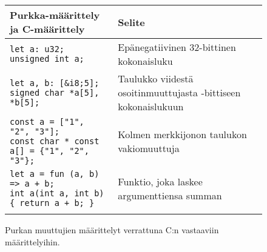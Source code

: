 \begin{figure}[ht!]
    \begin{adjustbox}{center}
        \begin{tabular}{@{} m{} m{} @{}} \toprule
            Purkka-määrittely ja C-määrittely & Selite \\ \midrule

            \texttt{let a: u32; \newline unsigned int a;} & Epänegatiivinen 32-bittinen kokonaisluku \\
            \noalign{\vspace{0.2cm}}

            \texttt{let a, b: [\&i8;5]; \newline signed char *a[5], *b[5];} & Taulukko viidestä osoitinmuuttujasta \newline 8-bittiseen kokonaislukuun \\
            \noalign{\vspace{0.2cm}}

            \texttt{const a = ["1", "2", "3"]; \newline const char * const a[] = \{"1", "2", "3"\};} & Kolmen merkkijonon taulukon vakiomuuttuja \\
            \noalign{\vspace{0.2cm}}

            \texttt{let a = fun (a, b) => a + b; \newline int a(int a, int b) \{ return a + b; \}} & Funktio, joka laskee argumenttiensa summan \\
            \noalign{\vspace{0.2cm}}

            \bottomrule
        \end{tabular}
    \end{adjustbox}
    \label{fig:declarations}
    \caption{Purkan muuttujien määrittelyt verrattuna C:n vastaaviin
    määrittelyihin.}
\end{figure}


